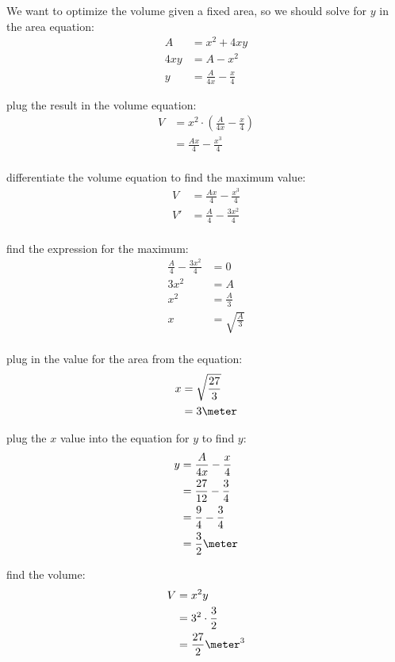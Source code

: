 \documentclass[fleqn,addpoints]{exam}
\begin{document}
\begin{questions}
\begin{solution}
We want to optimize the volume given a fixed area, so we should solve for $y$ in the area equation:
\begin{align*}
  A &= x^2 + 4xy \\
  4xy &= A - x^2 \\
  y &= \frac{A}{4x} - \frac{x}{4}
\end{align*}

plug the result in the volume equation:
\begin{align*}
  V &= x^2 \cdot \left( \frac{A}{4x} - \frac{x}{4} \right) \\
   &= \frac{Ax}{4} - \frac{x^3}{4} \\
\end{align*}

differentiate the volume equation to find the maximum value:
\begin{align*}
  V &= \frac{Ax}{4} - \frac{x^3}{4} \\
  V' &= \frac{A}{4} - \frac{3x^2}{4} \\
\end{align*}

find the expression for the maximum:
\begin{align*}
  \frac{A}{4} - \frac{3x^2}{4} &= 0 \\
  3x^2 &= A \\
   x^2 &= \frac{A}{3} \\
   x &= \sqrt{\frac{A}{3}} \\
\end{align*}

plug in the value for the area from the equation:
\begin{align*}
  x &=  \sqrt{\frac{27}{3}} \\
    &= 3 \meter \\
\end{align*}

plug the $x$ value into the equation for $y$ to find $y$:
\begin{align*}
  y &= \frac{A}{4x} - \frac{x}{4} \\
    &= \frac{27}{12} - \frac{3}{4} \\
    &= \frac{9}{4} - \frac{3}{4} \\
    &= \frac{3}{2} \meter \\
\end{align*}

find the volume:
\begin{align*}
  V &= x^2y \\
    &= 3^2 \cdot \frac{3}{2} \\
    &= \frac{27}{2} \meter^3 \\
\end{align*}
\end{solution}


\end{questions}
\end{document}
